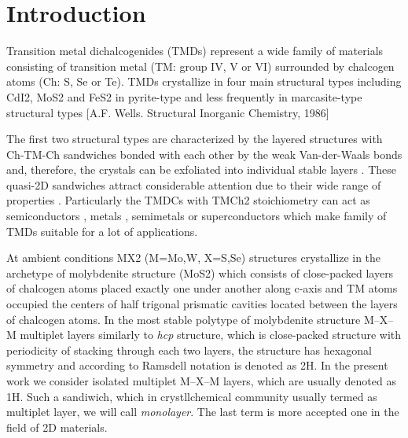 \documentclass[a4paperm]{article}
\begin{document}
\section{Introduction}

Transition metal dichalcogenides (TMDs) represent a wide family of materials consisting of transition metal (TM: group IV, V or VI) surrounded by chalcogen atoms (Ch: S, Se or Te). 
TMDs crystallize in four main structural types including CdI2, MoS2 and FeS2 in pyrite-type and less frequently in marcasite-type structural types \cite{wells1986_book} [A.F. Wells. Structural Inorganic Chemistry, 1986]

The first two structural types are characterized by the layered structures with Ch-TM-Ch sandwiches bonded with each other by the weak Van-der-Waals bonds and, therefore, the crystals can be exfoliated into individual stable layers \cite{zhang2020intercalation}. These quasi-2D sandwiches attract considerable attention due to their wide range of properties \cite{li2017graphene, SHI20181, xi2016ising, hu2019recent, pi2019recent}. 
Particularly the TMDCs with TMCh2 stoichiometry can act as semiconductors \cite{nayeri2018transport}, metals \cite{zhao20212d}, semimetals \cite{xu2020high, zhao2020observation} or superconductors \cite{wang2020nodeless,hsu2017topological} which make family of TMDs suitable for a lot of applications. 

At ambient conditions MX2 (M=Mo,W, X=S,Se) structures crystallize in the archetype of molybdenite structure (MoS2) which consists of close-packed layers of chalcogen atoms placed exactly one under another along c-axis and TM atoms occupied the centers of half trigonal prismatic cavities located between the layers of chalcogen atoms. 
In the most stable polytype of molybdenite structure M--X--M multiplet layers similarly to {\it hcp} structure, which is close-packed structure with periodicity of stacking through each two layers, the structure has hexagonal symmetry and according to Ramsdell notation is denoted as 2H.
In the present work we consider isolated multiplet M--X--M layers, which are usually denoted as 1H.
Such a sandiwich, which in crystllchemical community usually termed as multiplet layer, we will call {\it monolayer}.
The last term is more accepted one in the field of 2D materials. 
\end{document}
